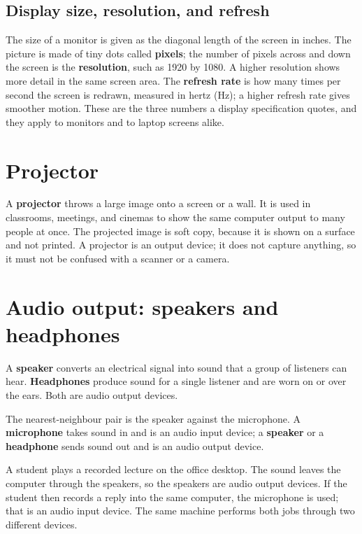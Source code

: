 \subsection{Display size, resolution, and refresh}
The size of a monitor is given as the diagonal length of the screen in inches.
The picture is made of tiny dots called \textbf{pixels}; the number of pixels
across and down the screen is the \textbf{resolution}, such as 1920 by 1080. A
higher resolution shows more detail in the same screen area. The
\textbf{refresh rate} is how many times per second the screen is redrawn,
measured in hertz (Hz); a higher refresh rate gives smoother motion. These are
the three numbers a display specification quotes, and they apply to monitors
and to laptop screens alike.

\section{Projector}
A \textbf{projector} throws a large image onto a screen or a wall. It is used
in classrooms, meetings, and cinemas to show the same computer output to many
people at once. The projected image is soft copy, because it is shown on a
surface and not printed. A projector is an output device; it does not capture
anything, so it must not be confused with a scanner or a camera.

\section{Audio output: speakers and headphones}
A \textbf{speaker} converts an electrical signal into sound that a group of
listeners can hear. \textbf{Headphones} produce sound for a single listener
and are worn on or over the ears. Both are audio output devices.

The nearest-neighbour pair is the speaker against the microphone. A
\textbf{microphone} takes sound in and is an audio input device; a
\textbf{speaker} or a \textbf{headphone} sends sound out and is an audio
output device.

\begin{example}
A student plays a recorded lecture on the office desktop. The sound leaves the
computer through the speakers, so the speakers are audio output devices. If
the student then records a reply into the same computer, the microphone is
used; that is an audio input device. The same machine performs both jobs
through two different devices.
\end{example}


